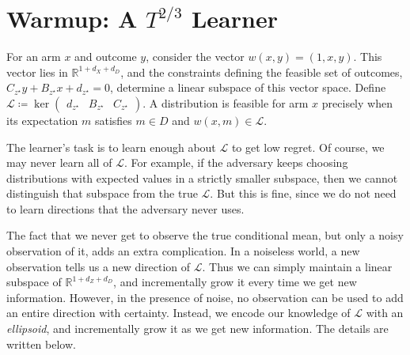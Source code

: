 {

\section{Warmup: A $T^{2/3}$ Learner}\label{sec:hard-ellipsoid-warmup}

For an arm $x$ and outcome $y$, consider the vector $w \left( x , y \right) = \left( 1 , x , y \right)$.
This vector lies in $\mathbb{R}^{1 + d_{X} + d_{D}}$, and the constraints defining the
feasible set of outcomes, $C_{z^{\star}} y + B_{z^{\star}} x + d_{z^{\star}} = 0$,
determine a linear subspace of this vector space. Define $\mathcal{L} \coloneqq \operatorname{ker} \begin{pmatrix}d_{z^{\star}} & B_{z^{\star}} & C_{z^{\star}}\end{pmatrix} .$ A distribution is feasible for arm $x$ precisely when its expectation $m$ satisfies $m \in D$ and $w \left( x , m \right) \in \mathcal{L}$.
}{The learner's task is to learn enough about $\mathcal{L}$ to get low regret.
Of course, we may never learn all of $\mathcal{L}$. For example, if the adversary keeps
choosing distributions with expected values in a strictly smaller subspace, then we cannot
distinguish that subspace from the true $\mathcal{L}$. But this is fine, since we do
not need to learn directions that the adversary never uses.}

The fact that we never get to observe the true conditional mean, but only a noisy observation of it, adds an extra complication. In a noiseless world, a new observation tells us a new direction of $\mathcal{L}$. Thus we can simply maintain a linear subspace of $\mathbb{R}^{1 + d_{Z} + d_{D}}$, and incrementally grow it every time we get new information. However, in the presence of noise, no observation can be used to add an entire direction with certainty. Instead, we encode our knowledge of $\mathcal{L}$ with an \emph{ellipsoid}, and incrementally grow it as we get new information. The details are written below.

